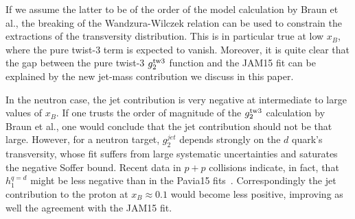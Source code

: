 \documentclass[preprintnumbers,floatfix,nofootinbib]{revtex4}
\newcommand{\xbj}{{x_B}}                   %
\begin{document}
If we assume the latter to be of the order of the model calculation
by Braun et al., the breaking of the Wandzura-Wilczek relation can be used to
constrain the extractions of the transversity distribution. This is in particular true at low $\xbj$, where the pure twist-3 term is expected to vanish. 
Moreover, it is quite clear that the gap
between the pure twist-3 $g_2^{\rm tw3}$ function and the JAM15 fit can be
explained by the new jet-mass contribution we discuss in this paper.  

In the neutron case, the jet contribution is very negative at intermediate to
large values of $\xbj$. 
If one trusts the order of magnitude of the $g_2^{\rm tw3}$
calculation by Braun et al., one would conclude that the jet contribution
should not be that large. However, for a neutron target, $g_2^{jet}$ depends strongly on the $d$ quark's transversity, whose fit suffers from large systematic uncertainties and saturates the negative Soffer bound. Recent data in $p+p$ collisions indicate, in fact, that $h_1^{q=d}$ might be less negative than in the Pavia15 fits~\cite{Radici:2016lam}.
Correspondingly the jet contribution to the proton at $\xbj \approx 0.1$
would become less positive, improving as well the agreement with the JAM15
fit. 
\end{document}
